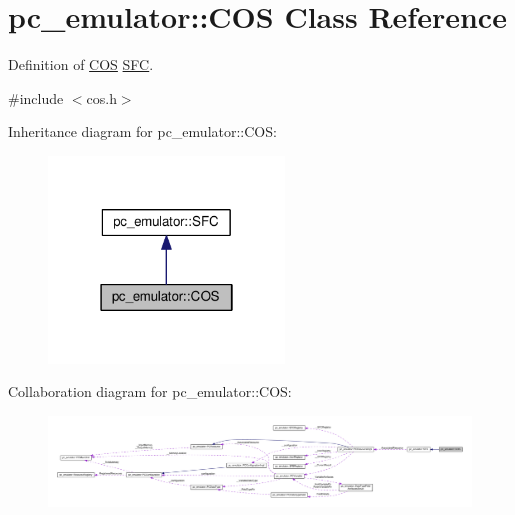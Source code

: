 \hypertarget{classpc__emulator_1_1COS}{}\section{pc\+\_\+emulator\+:\+:C\+OS Class Reference}
\label{classpc__emulator_1_1COS}


Definition of \hyperlink{classpc__emulator_1_1COS}{C\+OS} \hyperlink{classpc__emulator_1_1SFC}{S\+FC}.  




{\ttfamily \#include $<$cos.\+h$>$}



Inheritance diagram for pc\+\_\+emulator\+:\+:C\+OS\+:
\nopagebreak
\begin{figure}[H]
\begin{center}
\leavevmode
\includegraphics[width=178pt]{classpc__emulator_1_1COS__inherit__graph}
\end{center}
\end{figure}


Collaboration diagram for pc\+\_\+emulator\+:\+:C\+OS\+:
\nopagebreak
\begin{figure}[H]
\begin{center}
\leavevmode
\includegraphics[width=350pt]{classpc__emulator_1_1COS__coll__graph}
\end{center}
\end{figure}
